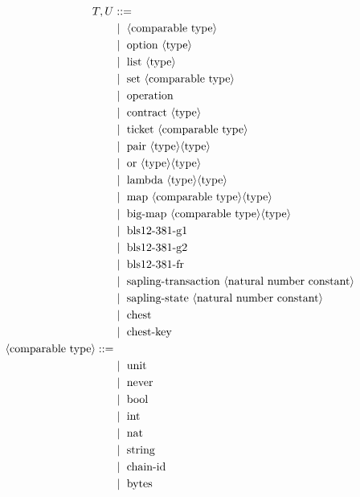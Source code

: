 \documentclass[a4paper,UKenglish,cleveref, autoref, thm-restate]{lipics-v2021}
\begin{document}
\begin{figure} []
\begin{align*}
T, U &::= \\
   &\Mid\ \langle \text{comparable type}\rangle \\
   &\Mid\ \text{option}\ \langle\text{type}\rangle \\
   &\Mid\ \text{list}\ \langle\text{type}\rangle \\
   &\Mid\ \text{set}\ \langle\text{comparable type}\rangle \\
   &\Mid\ \text{operation} \\
   &\Mid\ \text{contract}\ \langle\text{type}\rangle \\
   &\Mid\ \text{ticket}\ \langle\text{comparable type}\rangle \\
   &\Mid\ \text{pair}\ \langle\text{type}\rangle \langle\text{type}\rangle \\
   &\Mid\ \text{or}\ \langle\text{type}\rangle \langle\text{type}\rangle \\
   &\Mid\ \text{lambda}\ \langle\text{type}\rangle \langle\text{type}\rangle \\
   &\Mid\ \text{map}\ \langle\text{comparable type}\rangle \langle\text{type}\rangle \\
   &\Mid\ \text{big-map}\ \langle\text{comparable type}\rangle \langle\text{type}\rangle \\
   &\Mid\ \text{bls12-381-g1} \\
   &\Mid\ \text{bls12-381-g2} \\
   &\Mid\ \text{bls12-381-fr} \\
   &\Mid\ \text{sapling-transaction}\ \langle\text{natural number constant}\rangle \\
   &\Mid\ \text{sapling-state}\ \langle\text{natural number constant}\rangle \\
   &\Mid\ \text{chest} \\
   &\Mid\ \text{chest-key} \\
\langle\text{comparable type}\rangle ::= \\
   &\Mid\ \text{unit} \\
   &\Mid\ \text{never} \\
   &\Mid\ \text{bool} \\
   &\Mid\ \text{int}\\
   &\Mid\ \text{nat}\\
   &\Mid\ \text{string}\\
   &\Mid\ \text{chain-id}\\
   &\Mid\ \text{bytes}\\

\end{align*}
\end{figure}
\end{document}
